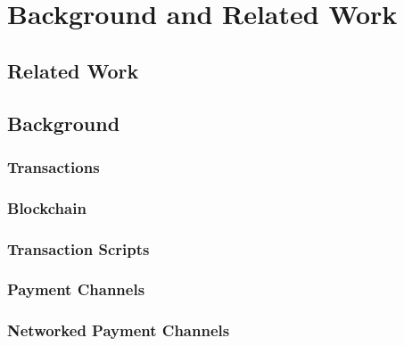 \chapter{Background and Related Work}
\label{chap:related}

\section{Related Work}


\section{Background}

\subsection{Transactions}

\subsection{Blockchain}

\subsection{Transaction Scripts}

\subsection{Payment Channels}

\subsection{Networked Payment Channels}
